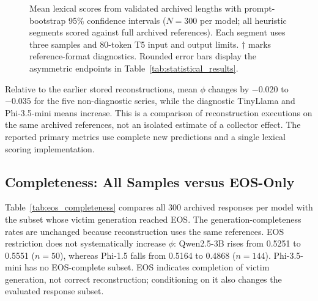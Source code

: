 \documentclass[electronics,article,submit,pdftex,moreauthors]{Definitions/mdpi}
\begin{document}
\begin{figure}[ht]
\centering
{}
\caption{Mean lexical scores from validated archived lengths with prompt-bootstrap 95\% confidence intervals ($N=300$ per model; all heuristic segments scored against full archived references). Each segment uses three samples and 80-token T5 input and output limits. $\dagger$ marks reference-format diagnostics. Rounded error bars display the asymmetric endpoints in Table~\ref{tab:statistical_results}.}
\label{fig:model_ci}
\end{figure}

Relative to the earlier stored reconstructions, mean $\phi$ changes by $-0.020$ to $-0.035$ for the five non-diagnostic series, while the diagnostic TinyLlama and Phi-3.5-mini means increase. This is a comparison of reconstruction executions on the same archived references, not an isolated estimate of a collector effect. The reported primary metrics use complete new predictions and a single lexical scoring implementation.

\subsection{Completeness: All Samples versus EOS-Only}
Table~\ref{tab:eos_completeness} compares all 300 archived responses per model with the subset whose victim generation reached EOS. The generation-completeness rates are unchanged because reconstruction uses the same references. EOS restriction does not systematically increase $\phi$: Qwen2.5-3B rises from 0.5251 to 0.5551 ($n=50$), whereas Phi-1.5 falls from 0.5164 to 0.4868 ($n=144$). Phi-3.5-mini has no EOS-complete subset. EOS indicates completion of victim generation, not correct reconstruction; conditioning on it also changes the evaluated response subset.
\end{document}
